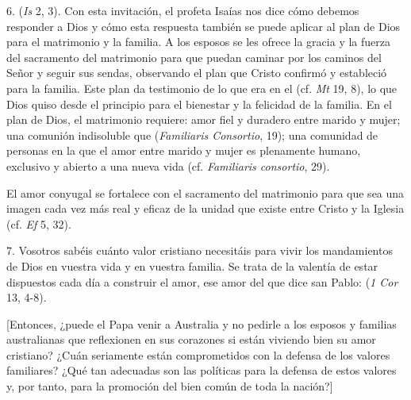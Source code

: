 \begin{body}
					6.  (\emph{Is} 2, 3). Con esta invitación, el profeta Isaías nos dice cómo debemos responder a Dios y cómo esta respuesta también se puede aplicar al plan de Dios para el matrimonio y la familia. A los esposos se les ofrece la gracia y la fuerza del sacramento del matrimonio para que puedan caminar por los caminos del Señor y seguir sus sendas, observando el plan que Cristo confirmó y estableció para la familia. Este plan da testimonio de lo que era en el  (cf. \emph{Mt} 19, 8), lo que Dios quiso desde el principio para el bienestar y la felicidad de la familia. En el plan de Dios, el matrimonio requiere: amor fiel y duradero entre marido y mujer; una comunión indisoluble que  (\emph{Familiaris Consortio}, 19); una comunidad de personas en la que el amor entre marido y mujer es plenamente humano, exclusivo y abierto a una nueva vida (cf. \emph{Familiaris consortio}, 29).
					
					El amor conyugal se fortalece con el sacramento del matrimonio para que sea una imagen cada vez más real y eficaz de la unidad que existe entre Cristo y la Iglesia (cf. \emph{Ef} 5, 32).
					
					7. Vosotros sabéis cuánto valor cristiano necesitáis para vivir los mandamientos de Dios en vuestra vida y en vuestra familia. Se trata de la valentía de estar dispuestos cada día a construir el amor, ese amor del que dice san Pablo:  (\emph{1 Cor} 13, 4-8).
					
					{[}Entonces, ¿puede el Papa venir a Australia y no pedirle a los esposos y familias australianas que reflexionen en sus corazones si están viviendo bien su amor cristiano? ¿Cuán seriamente están comprometidos con la defensa de los valores familiares? ¿Qué tan adecuadas son las políticas para la defensa de estos valores y, por tanto, para la promoción del bien común de toda la nación?{]}
					

\end{body}
